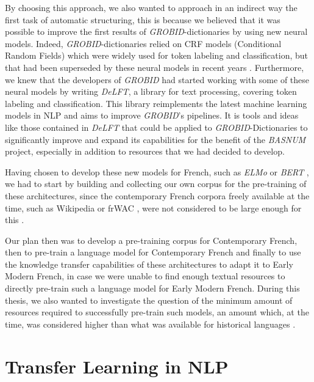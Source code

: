 By choosing this approach, we also wanted to approach in an indirect way the first task of automatic structuring, this is because we believed that it was possible to improve the first results of \emph{GROBID}-dictionaries by using new neural models. Indeed, \emph{GROBID}-dictionaries relied on CRF models (Conditional Random Fields) \cite{lafferty-etal-2001-conditional} which were widely used for token labeling and classification, but that had been superseded by these neural models in recent years \citep{lample-etal-2016-neural,devlin-etal-2019-bert}. Furthermore, we knew that the developers of \emph{GROBID} had started working with some of these neural models by writing \emph{DeLFT}, a library for text processing, covering token labeling and classification. This library reimplements the latest machine learning models in NLP \citep{lopez-etal-2018-delft} and aims to improve \emph{GROBID}'s pipelines. It is tools and ideas like those contained in \emph{DeLFT} that could be applied to \emph{GROBID}-Dictionaries to significantly improve and expand its capabilities for the benefit of the \emph{BASNUM} project, especially in addition to resources that we had decided to develop.


Having chosen to develop these new models for French, such as \emph{ELMo} \citep{peters-etal-2018-deep} or \emph{BERT} \cite{devlin-etal-2019-bert}, we had to start by building and collecting our own corpus for the pre-training of these architectures, since the contemporary French corpora freely available at the time, such as Wikipedia or frWAC \citep{baroni-etal-2009-the}, were not considered to be large enough for this \citep{liu-etal-2019-roberta}.

Our plan then was to develop a pre-training corpus for Contemporary French, then to pre-train a language model for Contemporary French and finally to use the knowledge transfer capabilities of these architectures to adapt it to Early Modern French, in case we were unable to find enough textual resources to directly pre-train such a language model for Early Modern French. During this thesis, we also wanted to investigate the question of the minimum amount of resources required to successfully pre-train such models, an amount which, at the time, was considered higher than what was available for historical languages \citep{peters-etal-2018-deep,liu-etal-2019-roberta}.

\section{Transfer Learning in NLP}

